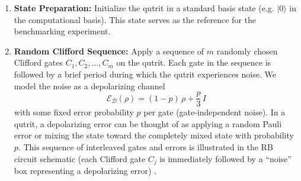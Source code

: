 \begin{enumerate}
    \item \textbf{State Preparation:} Initialize the qutrit in a standard basis state (e.g. $|0\rangle$ in the computational basis). This state serves as the reference for the benchmarking experiment.

    \item \textbf{Random Clifford Sequence:} Apply a sequence of $m$ randomly chosen Clifford gates $C_1, C_2, \dots, C_m$ on the qutrit. Each gate in the sequence is followed by a brief period during which the qutrit experiences noise. We model the noise as a depolarizing channel 
    \begin{equation}
        \mathcal{E}_{\mathcal{D}}(\rho)= (1-p)\,\rho+\frac{p}{3}\,I
        \label{eq:1-depol}
    \end{equation}
    with some fixed error probability $p$ per gate (gate-independent noise). In a qutrit, a depolarizing error can be thought of as applying a random Pauli error or mixing the state toward the completely mixed state with probability $p$. This sequence of interleaved gates and errors is illustrated in the RB circuit schematic (each Clifford gate $C_j$ is immediately followed by a “noise” box representing a depolarizing error) \cite{NielsenChuang2010,Emerson2005}. 
    

\end{enumerate}

